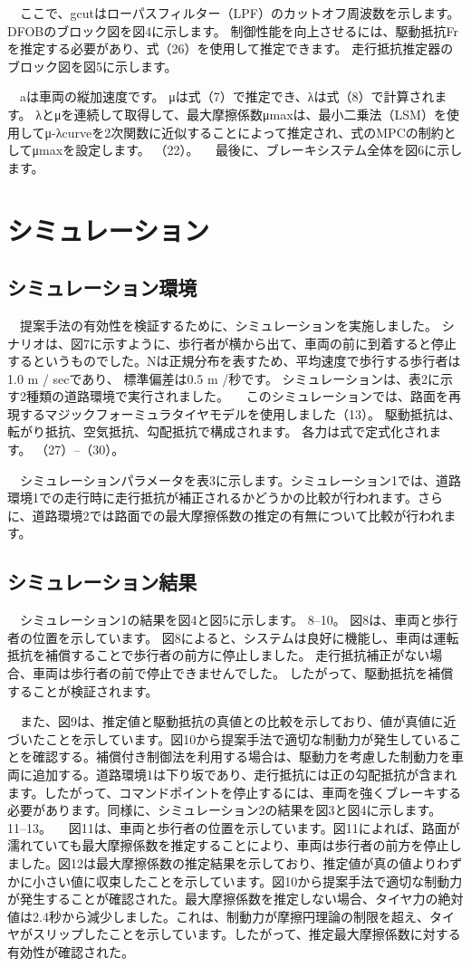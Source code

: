 　ここで、gcutはローパスフィルター（LPF）のカットオフ周波数を示します。 DFOBのブロック図を図4に示します。 制御性能を向上させるには、駆動抵抗Frを推定する必要があり、式（26）を使用して推定できます。 走行抵抗推定器のブロック図を図5に示します。

　aは車両の縦加速度です。 μは式（7）で推定でき、λは式（8）で計算されます。 λとμを連続して取得して、最大摩擦係数μmaxは、最小二乗法（LSM）を使用してμ-λcurveを2次関数に近似することによって推定され、式のMPCの制約としてμmaxを設定します。 （22）。
　最後に、ブレーキシステム全体を図6に示します。

\section{シミュレーション}
\subsection{シミュレーション環境}
　提案手法の有効性を検証するために、シミュレーションを実施しました。 シナリオは、図7に示すように、歩行者が横から出て、車両の前に到着すると停止するというものでした。Nは正規分布を表すため、平均速度で歩行する歩行者は1.0 m / secであり、 標準偏差は0.5 m /秒です。 シミュレーションは、表2に示す2種類の道路環境で実行されました。
　このシミュレーションでは、路面を再現するマジックフォーミュラタイヤモデルを使用しました（13）。 駆動抵抗は、転がり抵抗、空気抵抗、勾配抵抗で構成されます。 各力は式で定式化されます。 （27）–（30）。

　シミュレーションパラメータを表3に示します。シミュレーション1では、道路環境1での走行時に走行抵抗が補正されるかどうかの比較が行われます。さらに、道路環境2では路面での最大摩擦係数の推定の有無について比較が行われます。

\subsection{シミュレーション結果}
　シミュレーション1の結果を図4と図5に示します。 8–10。 図8は、車両と歩行者の位置を示しています。 図8によると、システムは良好に機能し、車両は運転抵抗を補償することで歩行者の前方に停止しました。 走行抵抗補正がない場合、車両は歩行者の前で停止できませんでした。 したがって、駆動抵抗を補償することが検証されます。

　また、図9は、推定値と駆動抵抗の真値との比較を示しており、値が真値に近づいたことを示しています。図10から提案手法で適切な制動力が発生していることを確認する。補償付き制御法を利用する場合は、駆動力を考慮した制動力を車両に追加する。道路環境1は下り坂であり、走行抵抗には正の勾配抵抗が含まれます。したがって、コマンドポイントを停止するには、車両を強くブレーキする必要があります。同様に、シミュレーション2の結果を図3と図4に示します。 11–13。
　図11は、車両と歩行者の位置を示しています。図11によれば、路面が濡れていても最大摩擦係数を推定することにより、車両は歩行者の前方を停止しました。図12は最大摩擦係数の推定結果を示しており、推定値が真の値よりわずかに小さい値に収束したことを示しています。図10から提案手法で適切な制動力が発生することが確認された。最大摩擦係数を推定しない場合、タイヤ力の絶対値は2.4秒から減少しました。これは、制動力が摩擦円理論の制限を超え、タイヤがスリップしたことを示しています。したがって、推定最大摩擦係数に対する有効性が確認された。


